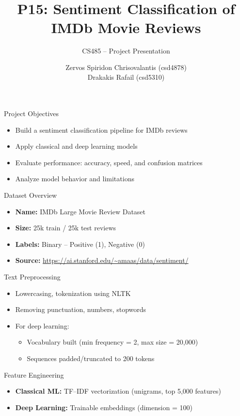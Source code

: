 \documentclass{beamer}
\title[P15: IMDb Sentiment Classification]{P15: Sentiment Classification of IMDb Movie Reviews}
\subtitle{CS485 – Project Presentation}
\author{Zervos Spiridon Chrisovalantis (csd4878) \\ Drakakis Rafail (csd5310)}
\date{}
\institute{University of Crete}
\begin{document}
\frame{\titlepage}

\begin{frame}{Project Objectives}
\begin{itemize}
  \item Build a sentiment classification pipeline for IMDb reviews
  \item Apply classical and deep learning models
  \item Evaluate performance: accuracy, speed, and confusion matrices
  \item Analyze model behavior and limitations
\end{itemize}
\end{frame}

\begin{frame}{Dataset Overview}
\begin{itemize}
  \item \textbf{Name:} IMDb Large Movie Review Dataset
  \item \textbf{Size:} 25k train / 25k test reviews
  \item \textbf{Labels:} Binary – Positive (1), Negative (0)
  \item \textbf{Source:} \url{https://ai.stanford.edu/~amaas/data/sentiment/}
\end{itemize}
\end{frame}

\begin{frame}{Text Preprocessing}
\begin{itemize}
  \item Lowercasing, tokenization using NLTK
  \item Removing punctuation, numbers, stopwords
  \item For deep learning:
  \begin{itemize}
    \item Vocabulary built (min frequency = 2, max size = 20,000)
    \item Sequences padded/truncated to 200 tokens
  \end{itemize}
\end{itemize}
\end{frame}

\begin{frame}{Feature Engineering}
\begin{itemize}
  \item \textbf{Classical ML:} TF–IDF vectorization (unigrams, top 5,000 features)
  \item \textbf{Deep Learning:} Trainable embeddings (dimension = 100)
\end{itemize}
\end{frame}
\end{document}
